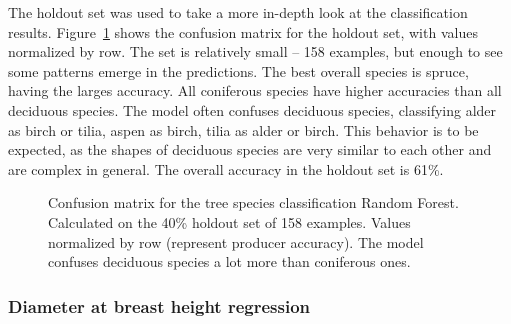 The holdout set was used to take a more in-depth look at the classification results.
Figure~\ref{fig-clf-confusion-matrix} shows the confusion matrix for the holdout set, with values normalized by row.
The set is relatively small – 158 examples, but enough to see some patterns emerge in the predictions.
The best overall species is spruce, having the larges accuracy.
All coniferous species have higher accuracies than all deciduous species.
The model often confuses deciduous species, classifying alder as birch or tilia, aspen as birch, tilia as alder or birch.
This behavior is to be expected, as the shapes of deciduous species are very similar to each other and are complex in general.
The overall accuracy in the holdout set is 61\%.

\begin{figure}
\caption[Confusion matrix for the tree species classification Random Forest.]{\label{fig-clf-confusion-matrix}Confusion matrix for the tree
species classification Random Forest. Calculated on the 40\% holdout set
    of 158 examples. Values normalized by row (represent producer accuracy). The model confuses deciduous
species a lot more than coniferous ones.}
\end{figure}

\subsubsection{Diameter at breast height regression}

